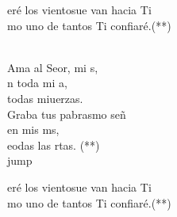 \begin{cancion}[Hacia Ti][Ixcís]
\begin{chorus}
	eré los vientosue van hacia Ti\\
	mo uno de tantos Ti confiaré.(**)\\
	\end{chorus}%
	\jump\\
	Ama al Seor, mi s, \\
	n toda mi a, \\
	 todas miuerzas.\\
	Graba tus pabrasmo señ  \\
	en mis ms, \\
	eodas las rtas. (**)\\jump\\
	\begin{chorus}%
	eré los vientosue van hacia Ti\\
	mo uno de tantos Ti confiaré.(**)\\
	\end{chorus}%
	\jump\\
\end{cancion}%
